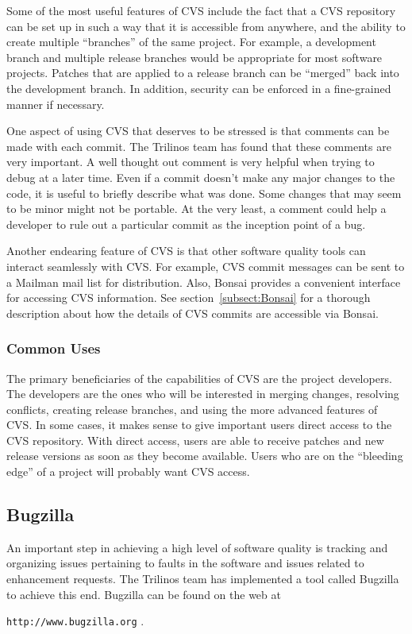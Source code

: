 \documentclass[12pt,relax]{article}
\newcommand{\InlineDirectory}[1]{
  {\hspace{0.01 in}} {\tt #1} {\hspace{0.01 in}}}
\begin{document}
Some of the most useful features of CVS include the fact that a CVS 
repository can be set up in such a way that it is accessible from anywhere, 
and the ability to create multiple ``branches'' of the same project.  For 
example, a development branch and multiple release branches would be 
appropriate for most software projects.  Patches that are applied 
to a release branch can be ``merged'' back into the development branch.  
In addition, security can be enforced in a fine-grained manner if necessary.  

One aspect of using CVS that deserves to be stressed is that comments can be 
made with each commit.  The Trilinos team has found that these comments are 
very important.  A well thought out comment is very helpful when trying to 
debug at a later time.  Even if a commit doesn't make any major changes to the 
code, it is useful to briefly describe what was done.  Some changes that may 
seem to be minor might not be portable.  At the very least, a comment could 
help a developer to rule out a particular commit as the inception point 
of a bug.

Another endearing feature of CVS is that other software quality tools can 
interact seamlessly with CVS.  For example, CVS commit messages can be sent to
a Mailman mail list for distribution.  Also, Bonsai provides a convenient 
interface for accessing CVS information.  See section~\ref{subsect:Bonsai} 
for a thorough description about how the details of CVS commits are accessible 
via Bonsai.

\subsubsection{Common Uses}

The primary beneficiaries of the capabilities of CVS are the project 
developers.  The developers are the ones who will be interested in merging 
changes, resolving conflicts, creating release branches, and using the more 
advanced features of CVS.  In some cases, it makes sense to give 
important users direct access to the CVS repository.  With direct access, 
users are able to receive patches and new release versions as soon as they 
become available.  Users who are on the ``bleeding edge'' of a project will 
probably want CVS access.

\subsection{Bugzilla}
\label{subsect:Bugzilla}
An important step in achieving a high level of software quality is tracking
and organizing issues pertaining to faults in the software and issues related 
to enhancement requests.  The Trilinos team has implemented a tool called 
Bugzilla~\cite{Bugzilla} to achieve this end.  Bugzilla  can be found 
on the web at \newline
\InlineDirectory{http://www.bugzilla.org}.
\end{document}
